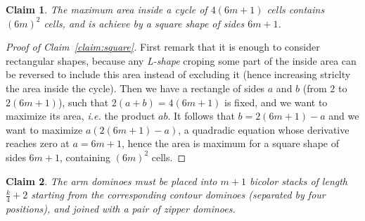 \documentclass[11pt,a4paper]{article}
\newtheorem{claim}{\textbf{Claim}}
\newcommand{\1}{\mathbb{1}}
\newcommand{\0}{\mathbb{0}}
\begin{document}
\begin{claim}
  The maximum area inside a cycle of $4(6m+1)$ cells contains $(6m)^2$ cells,
  and is achieve by a square shape of sides $6m+1$.
\end{claim}

\begin{proof}[Proof of Claim~\ref{claim:square}]
  First remark that it is enough to consider rectangular shapes, because any
  {\em L-shape} croping some part of the inside area can be reversed to include
  this area instead of excluding it (hence increasing striclty the area inside
  the cycle). Then we have a rectangle of sides $a$ and $b$ (from $2$ to
  $2(6m+1)$), such that $2(a+b)=4(6m+1)$ is fixed, and we want to maximize its
  area, {\em i.e.} the product $ab$. It follows that $b=2(6m+1)-a$ and we want
  to maximize $a(2(6m+1)-a)$, a quadradic equation whose derivative reaches zero
  at $a=6m+1$, hence the area is maximum for a square shape of sides $6m+1$,
  containing $(6m)^2$ cells.
\end{proof}

\begin{claim}
  The {\em arm} dominoes must be placed into $m+1$ bicolor stacks of length
  $\frac{k}{4}+2$ starting from the corresponding {\em contour} dominoes
  (separated by four positions), and joined with a pair of {\em zipper}
  dominoes.
\end{claim}
\end{document}
